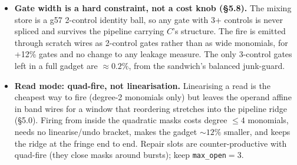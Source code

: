 \documentclass[11pt]{article}
\newcommand{\g}{\textsf{g57}}
\newcommand{\doc}[1]{\texttt{#1}}
\begin{document}
\begin{itemize}
  exact-affine measures are unaffected either way, and the
  cost is the read polynomial, $(3\,\doc{max\_open}+2)^2 = 121$ monomials per fire
  instead of $(2\,\doc{max\_open}+2)^2 = 64$. \textbf{\doc{max\_open}$=2$ balanced}
  brings the polynomial back to $8{\times}8 = 64$: measured 565,374 gates at $n=128$
  (+10\% over the plain \doc{max\_open}~3 build's 514,502, versus +92\% for balanced
  \doc{max\_open}~3's 984,384), with the same \doc{fire\_corr} statistics as balanced
  \doc{max\_open}~3 (interior median 0.076 vs 0.078, p90 0.137 vs 0.133, no bare
  intervals) --- but the gauntlet's two-feature scan separates them: one open
  mask is one uniform term, which a single visible monomial cancels (\S5.7).
  \doc{max\_open} 3 remains the clean build.
\item \textbf{Gate width is a hard constraint, not a cost knob (\S5.8).} The mixing store is
  a \g{} 2-control identity ball, so any gate with 3+ controls is never spliced and survives
  the pipeline carrying $C$'s structure. The fire is emitted through scratch wires as
  2-control gates rather than as wide monomials, for +12\% gates and no change to any leakage
  measure. The only 3-control gates left in a full gadget are ${\approx}0.2\%$, from the
  sandwich's balanced junk-guard.
\item \textbf{Read mode: quad-fire, not linearisation.} Linearising a read is the
  cheapest way to fire (degree-2 monomials only) but leaves the operand affine in
  band wires for a window that reordering stretches into the pipeline ridge
  (\S5.0). Firing from inside the quadratic masks costs degree $\le 4$ monomials,
  needs no linearise/undo bracket, makes the gadget ${\sim}12\%$ smaller, and keeps
  the ridge at the fringe end to end. Repair slots are counter-productive with
  quad-fire (they close masks around bursts); keep \doc{max\_open}$=3$.
\end{itemize}
\end{document}
